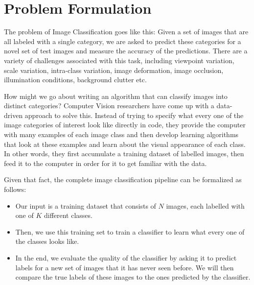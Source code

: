 \section{Problem Formulation}
The problem of Image Classification goes like this: Given a set of images that are all labeled with a single category, we are asked to predict these categories for a novel set of test images and measure the accuracy of the predictions. There are a variety of challenges associated with this task, including viewpoint variation, scale variation, intra-class variation, image deformation, image occlusion, illumination conditions, background clutter etc.


How might we go about writing an algorithm that can classify images into distinct categories? Computer Vision researchers have come up with a data-driven approach to solve this. Instead of trying to specify what every one of the image categories of interest look like directly in code, they provide the computer with many examples of each image class and then develop learning algorithms that look at these examples and learn about the visual appearance of each class. In other words, they first accumulate a training dataset of labelled images, then feed it to the computer in order for it to get familiar with the data.

Given that fact, the complete image classification pipeline can be formalized as follows:
\begin{itemize}
	\item Our input is a training dataset that consists of $N$ images, each labelled with one of $K$ different classes.
	\item Then, we use this training set to train a classifier to learn what every one of the classes looks like.
	\item  In the end, we evaluate the quality of the classifier by asking it to predict labels for a new set of images that it has never seen before. We will then compare the true labels of these images to the ones predicted by the classifier.
\end{itemize}
